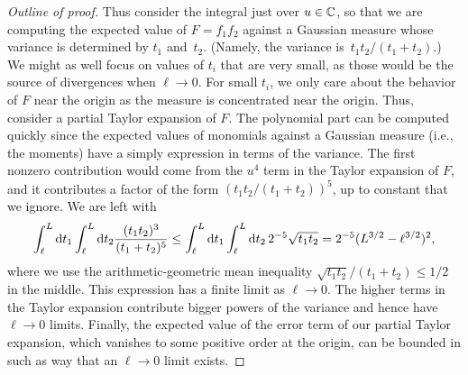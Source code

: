 \begin{proof}[Outline of proof]
Thus consider the integral just over $u \in \mathbb C$,
so that we are computing the expected value of $F=f_1 f_2$ against a Gaussian measure 
whose variance is determined by $t_1$ and~$t_2$.
(Namely, the variance is~$t_1 t_2/(t_1+t_2)$.)
We might as well focus on values of $t_i$ that are very small, 
as those would be the source of divergences when $\ell \to 0$.
For small $t_i$, we only care about the behavior of $F$ near the origin as the measure is concentrated near the origin.
Thus, consider a partial Taylor expansion of $F$.
The polynomial part can be computed quickly since the expected values of monomials against a Gaussian measure (i.e., the moments) have a simply expression in terms of the variance.
The first nonzero contribution would come from the $u^4$ term in the Taylor expansion of $F$,
and it contributes a factor of the form $(t_1 t_2/(t_1+t_2))^5$,
up to constant that we ignore.
We are left with
\[
\int_{\ell}^L {\rm d} t_1 \int_{\ell}^L {\rm d} t_2 \frac{(t_1t_2)^{3}}{(t_1 + t_2)^{5}} 
\leq \int_{\ell}^L {\rm d} t_1 \int_{\ell}^L {\rm d} t_2 \, 2^{-5}\sqrt{t_1t_2} 
= 2^{-5}(L^{3/2} - {\ell}^{3/2})^2,
\]
where we use the arithmetic-geometric mean inequality $\sqrt{t_1t_2}/(t_1+t_2)\leq 1/2$ in the middle.
This expression has a finite limit as $\ell \to 0$.
The higher terms in the Taylor expansion contribute bigger powers of the variance 
and hence have $\ell \to 0$ limits.
Finally, the expected value of the error term of our partial Taylor expansion, 
which vanishes to some positive order at the origin,
can be bounded in such as way that an $\ell \to 0$ limit exists.
\end{proof}

 
%
%


